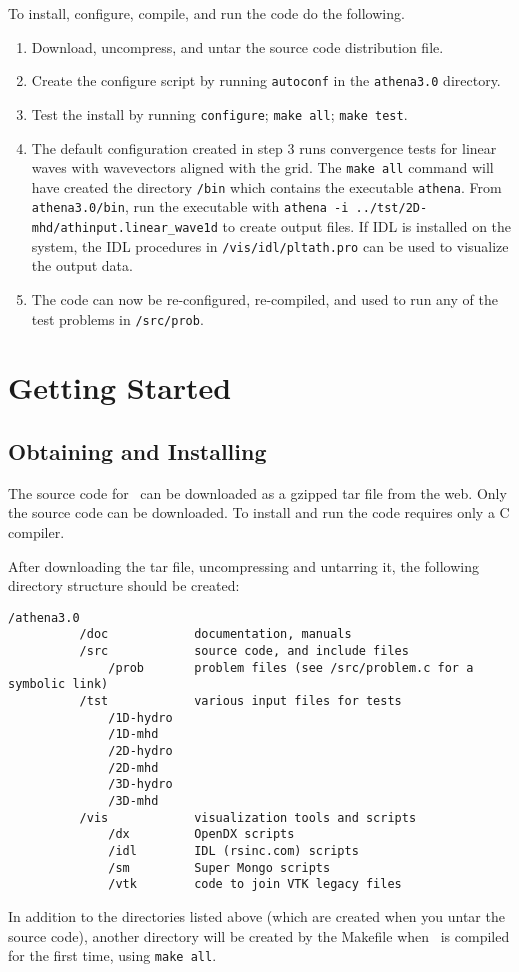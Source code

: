 To install, configure, compile, and run the code do the following.
\begin{enumerate}
\item Download, uncompress, and untar the source code distribution file.
\item Create the configure script by running {\tt autoconf} in the
{\tt athena3.0} directory.
\item Test the install by running {\tt configure}; {\tt make all};
{\tt make test}.
\item The default configuration created in step 3 runs convergence
tests for linear waves with wavevectors aligned with the grid.
The {\tt make all} command will have created the directory {\tt /bin} which
contains the executable {\tt athena}.  From {\tt athena3.0/bin}, run the
executable with 
{\tt athena -i ../tst/2D-mhd/athinput.linear\_wave1d} to create output files.
If IDL is installed on the system, the IDL procedures in {\tt /vis/idl/pltath.pro} can be used to visualize the output data.
\item The code can now be re-configured, re-compiled, and used to run any
of the test problems in {\tt /src/prob}.
\end{enumerate}

\section{Getting Started}

\subsection{Obtaining and Installing \ath}

The source code for \ath\ can be downloaded as a gzipped tar file from the
web.  Only the source code can be downloaded.  To install and run the code
requires only a C compiler.

After downloading the tar file, uncompressing and untarring it,
the following directory structure should be created:

\footnotesize
\begin{verbatim}
/athena3.0
          /doc            documentation, manuals
          /src            source code, and include files
              /prob       problem files (see /src/problem.c for a symbolic link)
          /tst            various input files for tests
              /1D-hydro
              /1D-mhd
              /2D-hydro
              /2D-mhd
              /3D-hydro
              /3D-mhd
          /vis            visualization tools and scripts
              /dx         OpenDX scripts
              /idl        IDL (rsinc.com) scripts
              /sm         Super Mongo scripts
              /vtk        code to join VTK legacy files
\end{verbatim}
\normalsize
In addition to the directories listed above (which are created when you
untar the source code), another directory will be created by the Makefile
when \ath\ is compiled for the first time, using {\tt make all}.

